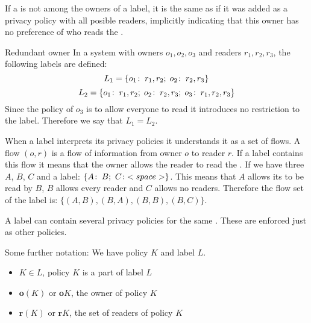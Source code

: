 If a \principal{} is not among the owners of a label, it is the same as if it was added as a privacy policy with all posible readers, implicitly indicating that this owner has no preference of who reads the \xvalue{}.

\begin{example}{Redundant owner}
In a system with owners $o_1, o_2, o_3$ and readers $r_1, r_2, r_3$, the following labels are defined:
$$L_1 = \{o_1\!:\;r_1,r_2;\; o_2\!:\;r_2, r_3\}$$
$$L_2 = \{o_1\!:\;r_1,r_2;\; o_2\!:\;r_2, r_3;\; o_3\!:\;r_1, r_2, r_3\}$$
Since the policy of $o_3$ is to allow everyone to read it introduces no restriction to the label.
Therefore we say that $L_1 = L_2$.
\end{example}

When a label interprets its privacy policies it understands it as a set of flows.
A flow $(o,r)$ is a flow of information from owner $o$ to reader $r$.
If a label contains this flow it means that the owner allows the reader to read the \xvalue{}.
If we have three \principals{} $A$, $B$, $C$ and a label: $\{\policy{A}{B}; \ \policy{C}{<space>}\}$.
This means that $A$ allows its \xvalue{} to be read by $B$, $B$ allows every reader and $C$ allows no readers.
Therefore the flow set of the label is: $\{(A,B), (B,A), (B,B), (B,C) \}$.

A label can contain several privacy policies for the same \principal{}.
These are enforced just as other policies.

Some further notation:
We have policy $K$ and label $L$.
\begin{itemize}
\item $K \in L$, policy $K$ is a part of label $L$
\item $\textbf{o}(K)$ or $\textbf{o}K$, the owner of policy $K$
\item $\textbf{r}(K)$ or $\textbf{r}K$, the set of readers of policy $K$
\end{itemize}

